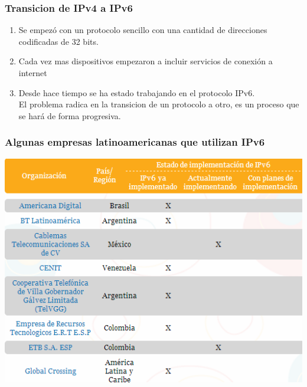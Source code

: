 \documentclass{beamer}
\begin{document}
\begin{frame}

\frametitle{Transicion de IPv4 a IPv6}

\begin{enumerate}[$*$]
	
	\item Se empezó con un protocolo sencillo con una cantidad de direcciones codificadas de 32 bits.
	\item Cada vez mas dispositivos empezaron a incluir servicios de conexión a internet
	\item Desde hace tiempo se ha estado trabajando en el protocolo IPv6.\\ El problema radica en la transicion de un protocolo a otro, es un proceso que se hará de forma progresiva.
\end{enumerate}

\end{frame}

\begin{frame}
\frametitle{Algunas empresas latinoamericanas que utilizan IPv6}

\includegraphics[height=1\textheight]{empresas_ipv6_la.png}

\end{frame}
\end{document}
